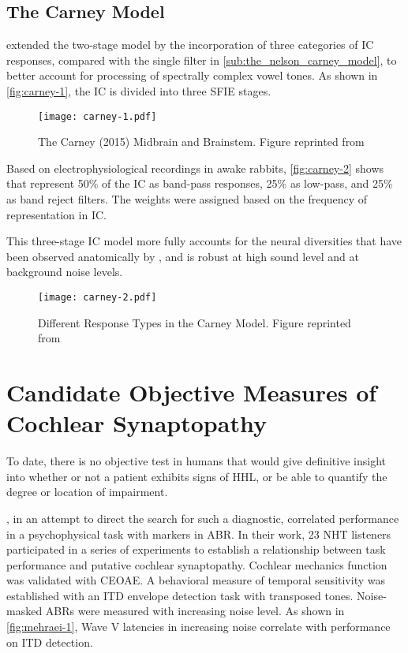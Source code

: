 \subsection{The Carney Model} %
\label{sub:the_carney_model}
\cite{Carney2015Speech} extended the two-stage \citeauthor{Nelson2004Phenomenological} model by the incorporation of three categories of IC responses, compared with the single filter in \autoref{sub:the_nelson_carney_model}, to better account for processing of spectrally complex vowel tones.  As shown in \autoref{fig:carney-1}, the IC is divided into three SFIE stages. 
\begin{figure}[htbp]
	\centering
	\texttt{[image: carney-1.pdf]}
	\caption{The Carney (2015) Midbrain and Brainstem.  Figure reprinted from~\cite{Carney2015Speech}}
	\label{fig:carney-1}
\end{figure}


Based on electrophysiological recordings in awake rabbits, \autoref{fig:carney-2} shows that \citeauthor{Carney2015Speech} represent 50\% of the IC as band-pass responses, 25\% as low-pass, and 25\% as band reject filters.  The weights were assigned based on the frequency of representation in IC.  

This three-stage IC model more fully accounts for the neural diversities that have been observed anatomically by \cite{Beebe2016Extracellular}, and is robust at high sound level and at background noise levels. 

\begin{figure}[htbp]
	\centering
	\texttt{[image: carney-2.pdf]}
	\caption{Different Response Types in the Carney Model.  Figure reprinted from~\cite{Carney2015Speech}}
	\label{fig:carney-2}
\end{figure}

\section{Candidate Objective Measures of Cochlear Synaptopathy} %
\label{sec:objective_measures_of_cochlear_synaptopathy}
To date, there is no objective test in humans that would give definitive insight into whether or not a patient exhibits signs of HHL, or be able to quantify the degree or location of impairment. 

\citeauthor{Mehraei2015Auditory}, in an attempt to direct the search for such a diagnostic, correlated performance in a psychophysical task with markers in ABR.  In their work, 23 NHT listeners participated in a series of experiments to establish a relationship between task performance and putative cochlear synaptopathy.   Cochlear mechanics function was validated with CEOAE.  A behavioral measure of temporal sensitivity was established with an ITD envelope detection task with transposed tones.  Noise-masked ABRs were measured with increasing noise level.   As shown in \autoref{fig:mehraei-1}, Wave V latencies in increasing noise correlate with performance on ITD detection.

